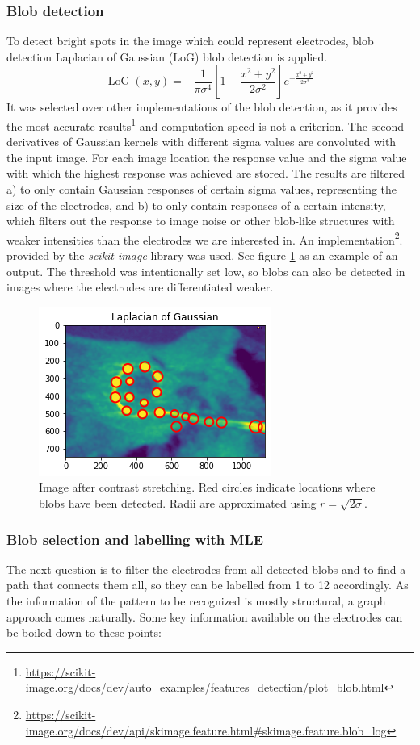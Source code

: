 \documentclass[a4paper, 11pt]{article}
\begin{document}
\subsubsection{Blob detection}
To detect bright spots in the image which could represent electrodes, blob detection Laplacian of Gaussian (LoG) blob detection is applied.
$$
\operatorname{LoG}(x, y)=-\frac{1}{\pi \sigma^{4}}\left[1-\frac{x^{2}+y^{2}}{2 \sigma^{2}}\right] e^{-\frac{x^{2}+y^{2}}{2 \sigma^{2}}}
$$
It was selected over other implementations of the blob detection, as it provides the most accurate results\footnote{\url{https://scikit-image.org/docs/dev/auto_examples/features_detection/plot_blob.html}} and computation speed is not a criterion. The second derivatives of Gaussian kernels with different sigma values are convoluted with the input image. For each image location the response value and the sigma value with which the highest response was achieved are stored. The results are filtered a) to only contain Gaussian responses of certain sigma values, representing the size of the electrodes, and b) to only contain responses of a certain intensity, which filters out the response to image noise or other blob-like structures with weaker intensities than the electrodes we are interested in. An implementation\footnote{\url{https://scikit-image.org/docs/dev/api/skimage.feature.html#skimage.feature.blob_log}}.
provided by the \emph{scikit-image} \cite{scikit-image} library was used.
See figure \ref{blobs_detected} as an example of an output. The threshold was intentionally set low, so blobs can also be detected in images where the electrodes are differentiated weaker.

\begin{figure}[ht]
	\centering
  \includegraphics[width=.5\textwidth]{blobs_detected.png}
	\caption{Image after contrast stretching. Red circles indicate locations where blobs have been detected. Radii are approximated using $r=\sqrt{2\sigma}$.}
	\label{blobs_detected}
\end{figure}

\subsubsection{Blob selection and labelling with MLE}
The next question is to filter the electrodes from all detected blobs and to find a path that connects them all, so they can be labelled from 1 to 12 accordingly.  
As the information of the pattern to be recognized is mostly structural, a graph approach comes naturally. Some key information available on the electrodes can be boiled down to these points:
\end{document}
